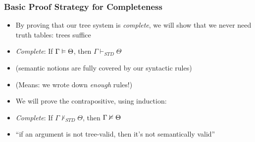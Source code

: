 \begin{frame}
\frametitle{Basic Proof Strategy for Completeness}

\begin{itemize}[<+->]

\item By proving that our tree system is \textit{complete}, we will show that we never need truth tables: trees suffice

\medskip 

\bi

\item \emph{Complete}: If $\Gamma \vDash \Theta$, then $\Gamma \vdash_{STD} \Theta$

\item (semantic notions are fully covered by our syntactic rules)

\item (Means: we wrote down \textit{enough} rules!)

\ei

\bigskip

\item We will prove the contrapositive, using induction: 

\item \emph{Complete}: If $\Gamma \nvdash_{STD} \Theta$, then $\Gamma \nvDash \Theta$

\item ``if an argument is not tree-valid, then it's not semantically valid''


\end{itemize}
\end{frame}


